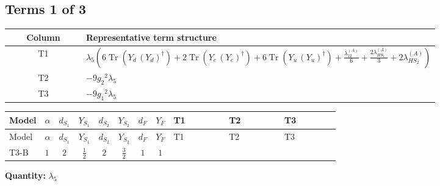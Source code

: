 \documentclass[8pt]{article}
\begin{document}
\begin{landscape}
\subsection*{Terms 1 of 3}
\begin{center}
\begin{tabular}{@{}c >{\raggedright\arraybackslash}p{0.82\linewidth}@{}}
\toprule
Column & Representative term structure \\
\midrule
T1 & \(\displaystyle {\lambda_5} \left(6 \operatorname{Tr}\!\left({Y_d}\,\left({Y_d}\right)^{\dagger}\right)+2 \operatorname{Tr}\!\left({Y_e}\,\left({Y_e}\right)^{\dagger}\right)+6 \operatorname{Tr}\!\left({Y_u}\,\left({Y_u}\right)^{\dagger}\right)+\frac{{\lambda_{12}^{(A)}}}{6}+\frac{2 {\lambda_{HS_1}^{(A)}}}{3}+2 {\lambda_{HS_2}^{(A)}}\right)\) \\
\midrule
T2 & \(\displaystyle -9 {g_2}^2 {\lambda_5}\) \\
\midrule
T3 & \(\displaystyle -9 {g_1}^2 {\lambda_5}\) \\
\midrule
\bottomrule
\end{tabular}
\end{center}
\smallskip
\tiny
\begin{longtable}{@{}llcccccc >{\raggedright\arraybackslash}p{0.21\linewidth} >{\raggedright\arraybackslash}p{0.21\linewidth} >{\raggedright\arraybackslash}p{0.21\linewidth}@{}}
\toprule
Model & $\alpha$ & $d_{S_1}$ & $Y_{S_1}$ & $d_{S_2}$ & $Y_{S_2}$ & $d_F$ & $Y_F$ & T1 & T2 & T3 \\
\midrule
\endfirsthead
\toprule
Model & $\alpha$ & $d_{S_1}$ & $Y_{S_1}$ & $d_{S_2}$ & $Y_{S_2}$ & $d_F$ & $Y_F$ & T1 & T2 & T3 \\
\midrule
\endhead
T3-B & $1$ & $2$ & $\frac{1}{2}$ & $2$ & $\frac{3}{2}$ & $1$ & $1$ & \scriptsize\adjustbox{max width=\linewidth}{$\begin{gathered} {\lambda_5} \left(6 \operatorname{Tr}\!\left({Y_d}\,\left({Y_d}\right)^{\dagger}\right)+2 \operatorname{Tr}\!\left({Y_e}\,\left({Y_e}\right)^{\dagger}\right)+6 \operatorname{Tr}\!\left({Y_u}\,\left({Y_u}\right)^{\dagger}\right)+\frac{{\lambda_{12}^{(A)}}}{6}+\frac{2 {\lambda_{HS_1}^{(A)}}}{3}+2 {\lambda_{HS_2}^{(A)}}\right)\end{gathered}$} & \scriptsize\adjustbox{max width=\linewidth}{$\begin{gathered} -9 {g_2}^2 {\lambda_5}\end{gathered}$} & \scriptsize\adjustbox{max width=\linewidth}{$\begin{gathered} -9 {g_1}^2 {\lambda_5}\end{gathered}$} \\
\midrule
\bottomrule
\end{longtable}
\clearpage
\noindent\textbf{Quantity: }$\lambda_5$\par\smallskip

\end{landscape}
\end{document}
